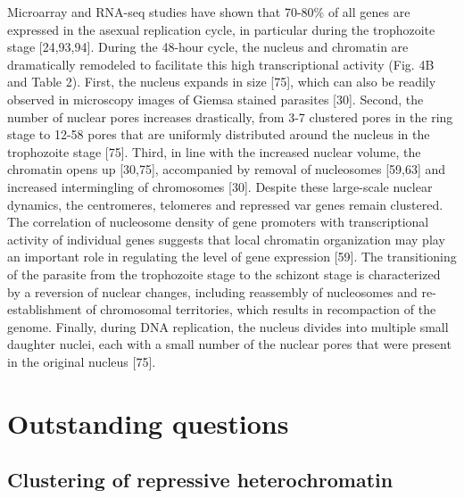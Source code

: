 Microarray and RNA-seq studies have shown that 70-80\% of all genes are
expressed in the asexual replication cycle, in particular during the
trophozoite stage [24,93,94]. During the 48-hour cycle, the nucleus and
chromatin are dramatically remodeled to facilitate this high transcriptional
activity (Fig. 4B and Table 2). First, the nucleus expands in size [75], which
can also be readily observed in microscopy images of Giemsa stained parasites
[30]. Second, the number of nuclear pores increases drastically, from 3-7
clustered pores in the ring stage to 12-58 pores that are uniformly
distributed around the nucleus in the trophozoite stage [75]. Third, in line
with the increased nuclear volume, the chromatin opens up [30,75], accompanied
by removal of nucleosomes [59,63] and increased intermingling of chromosomes
[30]. Despite these large-scale nuclear dynamics, the centromeres, telomeres
and repressed var genes remain clustered. The correlation of nucleosome
density of gene promoters with transcriptional activity of individual genes
suggests that local chromatin organization may play an important role in
regulating the level of gene expression [59]. The transitioning of the
parasite from the trophozoite stage to the schizont stage is characterized by
a reversion of nuclear changes, including reassembly of nucleosomes and
re-establishment of chromosomal territories, which results in recompaction of
the genome. Finally, during DNA replication, the nucleus divides into multiple
small daughter nuclei, each with a small number of the nuclear pores that were
present in the original nucleus [75].

\section{Outstanding questions}

\subsection{Clustering of repressive heterochromatin}

